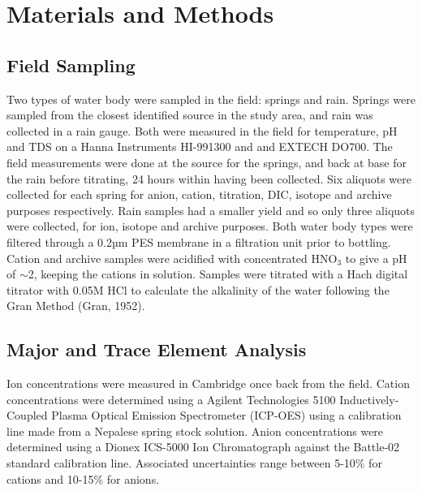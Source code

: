 
\section{Materials and Methods}



\subsection{Field Sampling}
Two types of water body were sampled in the field: springs and rain. Springs were sampled from the closest identified source in
 the study area, and rain was collected in a rain gauge.
Both were measured in the field for temperature, pH and TDS on a Hanna Instruments HI-991300 and  and EXTECH DO700. The field measurements 
were done at the source for the springs, and back at base for the rain before titrating, 
24 hours within having been collected. 
Six aliquots were collected for each spring for anion, cation, titration, DIC, isotope and archive purposes respectively. 
Rain samples had a smaller yield and so only three aliquots were collected, for ion, isotope and archive purposes. 
Both water body types were filtered through a 0.2µm PES membrane in a filtration unit prior to bottling. 
Cation and archive samples were acidified with concentrated HNO$_3$ to give a pH of $\sim$2, keeping the cations in solution. 
Samples were titrated with a Hach digital titrator with 0.05M HCl to calculate the alkalinity of the water following the Gran Method (Gran, 1952).






\subsection{Major and Trace Element Analysis}

Ion concentrations were measured in Cambridge once back from the field. Cation concentrations were determined using a Agilent Technologies 
5100 Inductively-Coupled Plasma Optical Emission Spectrometer (ICP-OES) using a calibration line made from a Nepalese spring stock solution.
Anion concentrations were determined using a Dionex ICS-5000 Ion Chromatograph against the Battle-02 standard calibration line. Associated 
uncertainties range between 5-10\% for cations and 10-15\% for anions.

